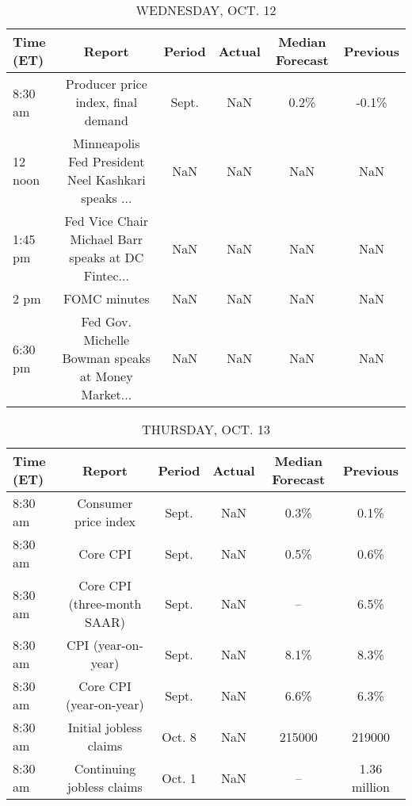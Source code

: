 \documentclass{article}%
\begin{document}
\begin{table}[htbp]%
\caption{WEDNESDAY, OCT. 12}%
\centering%
\begin{adjustbox}{width=1\textwidth}%
\begin{tabular}{lccccc}
\toprule
Time (ET) &                                             Report & Period & Actual & Median Forecast & Previous \\
\midrule
  8:30 am &                 Producer price index, final demand &  Sept. &    NaN &            0.2\% &    -0.1\% \\
  12 noon & Minneapolis Fed President Neel Kashkari speaks ... &    NaN &    NaN &             NaN &      NaN \\
  1:45 pm & Fed Vice Chair Michael Barr speaks at DC Fintec... &    NaN &    NaN &             NaN &      NaN \\
     2 pm &                                       FOMC minutes &    NaN &    NaN &             NaN &      NaN \\
  6:30 pm & Fed Gov. Michelle Bowman speaks at Money Market... &    NaN &    NaN &             NaN &      NaN \\
\bottomrule
\end{tabular}
%
\end{adjustbox}%
\end{table}

%


\begin{table}[htbp]%
\caption{THURSDAY, OCT. 13}%
\centering%
\begin{adjustbox}{width=1\textwidth}%
\begin{tabular}{lccccc}
\toprule
Time (ET) &                      Report & Period & Actual & Median Forecast &     Previous \\
\midrule
  8:30 am &        Consumer price index &  Sept. &    NaN &            0.3\% &         0.1\% \\
  8:30 am &                    Core CPI &  Sept. &    NaN &            0.5\% &         0.6\% \\
  8:30 am & Core CPI (three-month SAAR) &  Sept. &    NaN &              -- &         6.5\% \\
  8:30 am &          CPI (year-on-year) &  Sept. &    NaN &            8.1\% &         8.3\% \\
  8:30 am &     Core CPI (year-on-year) &  Sept. &    NaN &            6.6\% &         6.3\% \\
  8:30 am &      Initial jobless claims & Oct. 8 &    NaN &          215000 &       219000 \\
  8:30 am &   Continuing jobless claims & Oct. 1 &    NaN &              -- & 1.36 million \\
\bottomrule
\end{tabular}
%
\end{adjustbox}%
\end{table}
\end{document}
